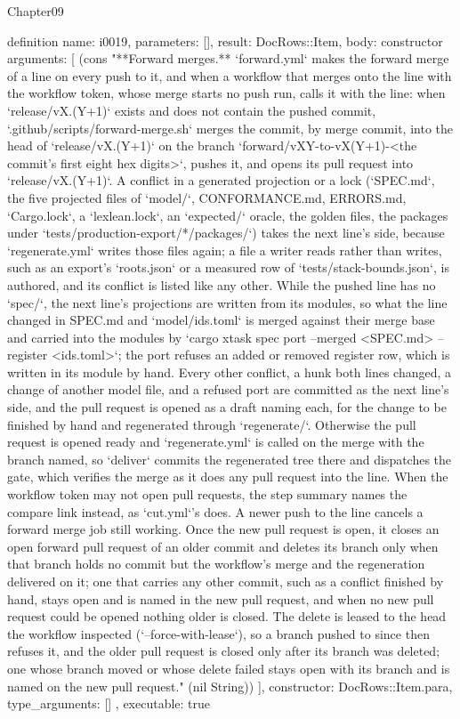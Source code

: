 \begin{lexlean}{Chapter09}
\begin{semanticmodule}
definition{
  name: i0019,
  parameters: [],
  result: DocRows::Item,
  body: constructor{
    arguments: [
      (cons "**Forward merges.** `forward.yml` makes the forward merge of a line on every push to it, and when a workflow that merges onto the line with the workflow token, whose merge starts no push run, calls it with the line: when `release/vX.(Y+1)` exists and does not contain the pushed commit, `.github/scripts/forward-merge.sh` merges the commit, by merge commit, into the head of `release/vX.(Y+1)` on the branch `forward/vXY-to-vX(Y+1)-<the commit's first eight hex digits>`, pushes it, and opens its pull request into `release/vX.(Y+1)`. A conflict in a generated projection or a lock (`SPEC.md`, the five projected files of `model/`, CONFORMANCE.md, ERRORS.md, `Cargo.lock`, a `lexlean.lock`, an `expected/` oracle, the golden files, the packages under `tests/production-export/*/packages/`) takes the next line's side, because `regenerate.yml` writes those files again; a file a writer reads rather than writes, such as an export's `roots.json` or a measured row of `tests/stack-bounds.json`, is authored, and its conflict is listed like any other. While the pushed line has no `spec/`, the next line's projections are written from its modules, so what the line changed in SPEC.md and `model/ids.toml` is merged against their merge base and carried into the modules by `cargo xtask spec port --merged <SPEC.md> --register <ids.toml>`; the port refuses an added or removed register row, which is written in its module by hand. Every other conflict, a hunk both lines changed, a change of another model file, and a refused port are committed as the next line's side, and the pull request is opened as a draft naming each, for the change to be finished by hand and regenerated through `regenerate/`. Otherwise the pull request is opened ready and `regenerate.yml` is called on the merge with the branch named, so `deliver` commits the regenerated tree there and dispatches the gate, which verifies the merge as it does any pull request into the line. When the workflow token may not open pull requests, the step summary names the compare link instead, as `cut.yml`'s does. A newer push to the line cancels a forward merge job still working. Once the new pull request is open, it closes an open forward pull request of an older commit and deletes its branch only when that branch holds no commit but the workflow's merge and the regeneration delivered on it; one that carries any other commit, such as a conflict finished by hand, stays open and is named in the new pull request, and when no new pull request could be opened nothing older is closed. The delete is leased to the head the workflow inspected (`--force-with-lease`), so a branch pushed to since then refuses it, and the older pull request is closed only after its branch was deleted; one whose branch moved or whose delete failed stays open with its branch and is named on the new pull request." (nil String))
    ],
    constructor: DocRows::Item.para,
    type_arguments: []
  },
  executable: true
}


\end{semanticmodule}
\end{lexlean}
